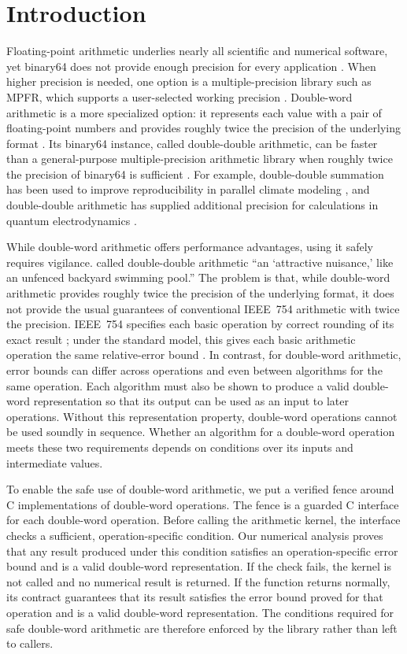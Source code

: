 \section{Introduction}
\label{sec:intro}

Floating-point arithmetic underlies nearly all scientific and numerical
software, yet binary64 does not provide enough precision for every application
\citep{Higham2002}.  When higher precision is needed, one option is a
multiple-precision library such as MPFR, which supports a user-selected working
precision \citep{Fousse2007}.  Double-word arithmetic is a more specialized
option: it represents each value with a pair of floating-point numbers and
provides roughly twice the precision of the underlying format
\citep{Dekker1971,Joldes2017}.  Its binary64 instance, called double-double
arithmetic, can be faster than a general-purpose multiple-precision arithmetic
library when roughly twice the precision of binary64 is sufficient \citep{Li2002}.
For example, double-double summation has been used to improve reproducibility
in parallel climate modeling \citep{HeDing2001}, and double-double arithmetic
has supplied additional precision for calculations in quantum electrodynamics
\citep{Aoyama2015}.

While double-word arithmetic offers performance advantages, using it safely
requires vigilance.  \citet{Li2002} called double-double arithmetic ``an
`attractive nuisance,' like an unfenced backyard swimming pool.''  The problem
is that, while double-word arithmetic provides roughly twice the precision of
the underlying format, it does not provide the usual guarantees of conventional
IEEE~754 arithmetic with twice the precision.  IEEE~754 specifies each basic
operation by correct rounding of its exact result \citep{IEEE754-2019}; under
the standard model, this gives each basic arithmetic operation the same
relative-error bound \citep{Higham2002}.  In contrast, for double-word
arithmetic, error bounds can differ across operations and even between
algorithms for the same operation.  Each algorithm must also be shown to
produce a valid double-word representation so that its output can be used as
an input to later operations.  Without this representation property,
double-word operations cannot be used soundly in sequence.  Whether an
algorithm for a double-word operation meets these two requirements depends on
conditions over its inputs and intermediate values.

To enable the safe use of double-word arithmetic, we put a verified fence
around C implementations of double-word operations.  The fence is a guarded C
interface for each double-word operation.  Before calling the arithmetic
kernel, the interface checks a sufficient, operation-specific condition.  Our
numerical analysis proves that any result produced under this condition
satisfies an operation-specific error bound and is a valid double-word
representation.  If the check fails, the kernel is not called and no numerical
result is returned.  If the function returns normally, its contract guarantees
that its result satisfies the error bound proved for that operation and is a
valid double-word representation.  The conditions required for safe
double-word arithmetic are therefore enforced by the library rather than left
to callers.

